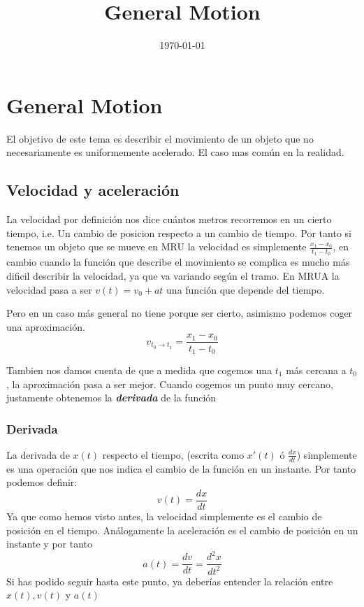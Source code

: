 \documentclass[11pt]{article}
\date{\today}
\title{General Motion}
\begin{document}
\maketitle

\section{General Motion}
\label{sec:orga83b068}
El objetivo de este tema es describir el movimiento de un objeto que no necesariamente es uniformemente acelerado. El caso mas común en la realidad.
\subsection{Velocidad y aceleración}
\label{sec:orgfa6f77a}
La velocidad por definición nos dice cuántos metros recorremos en un cierto tiempo, i.e. Un cambio de posicion respecto a un cambio de tiempo. Por tanto si tenemos un objeto que se mueve en MRU la velocidad es simplemente \(\frac{x_{1} - x_{0}}{t_{1} - t_{0}}\), en cambio cuando la función que describe el movimiento se complica es mucho más dificil describir la velocidad, ya que va variando según el tramo. En MRUA la velocidad pasa a ser \(v(t) = v_{0} + at\) una función que depende del tiempo.  

Pero en un caso más general no tiene porque ser cierto, asimismo podemos coger una aproximación. 
\[ v_{t_{0} \rightarrow t_{1}} = \frac{x_{1} - x_{0}}{t_{1} - t_{0}} \]

Tambien nos damos cuenta de que a medida que cogemos una \(t_{1}\) más cercana a \(t_{0}\), la aproximación pasa a ser mejor. Cuando cogemos un punto muy cercano, justamente obtenemos la \textbf{\textbf{\emph{derivada}}} de la función

\subsubsection{Derivada}
\label{sec:orga9f3b01}
La derivada de \(x(t)\) respecto el tiempo, (escrita como \(x'(t)\) ó \(\frac{dx}{dt}\)) simplemente es una operación que nos indica el cambio de la función en un instante. Por tanto podemos definir:
\[ 
v(t) =  \frac{dx}{dt}
\]
Ya que como hemos visto antes, la velocidad simplemente es el cambio de posición en el tiempo.
Análogamente la aceleración es el cambio de posición en un instante y por tanto 
\[
a(t) = \frac{dv}{dt} = \frac{d^{2}x}{dt^{2}}
\]
Si has podido seguir hasta este punto, ya deberías entender la relación entre \(x(t), v(t)\) y \(a(t)\)
\end{document}
